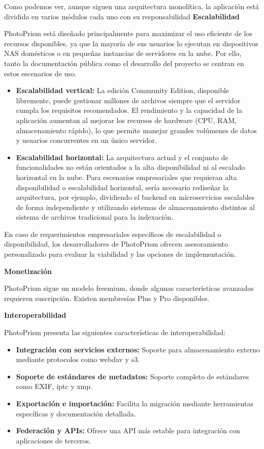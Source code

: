 Como podemos ver, aunque siguen una arquitectura monolítica, la aplicación está dividida en varios módulos cada uno con su responsabilidad
\textbf{Escalabilidad}

PhotoPrism está diseñado principalmente para maximizar el uso eficiente de los recursos disponibles, ya que la mayoría de sus usuarios lo ejecutan en dispositivos NAS domésticos o en pequeñas instancias de servidores en la nube. Por ello, tanto la documentación pública como el desarrollo del proyecto se centran en estos escenarios de uso.

\begin{itemize}
    \item \textbf{Escalabilidad vertical:} La edición Community Edition, disponible libremente, puede gestionar millones de archivos siempre que el servidor cumpla los requisitos recomendados. El rendimiento y la capacidad de la aplicación aumentan al mejorar los recursos de hardware (CPU, RAM, almacenamiento rápido), lo que permite manejar grandes volúmenes de datos y usuarios concurrentes en un único servidor.
    \item \textbf{Escalabilidad horizontal:} La arquitectura actual y el conjunto de funcionalidades no están orientados a la alta disponibilidad ni al escalado horizontal en la nube. Para escenarios empresariales que requieran alta disponibilidad o escalabilidad horizontal, sería necesario rediseñar la arquitectura, por ejemplo, dividiendo el backend en microservicios escalables de forma independiente y utilizando sistemas de almacenamiento distintos al sistema de archivos tradicional para la indexación.
\end{itemize}

En caso de requerimientos empresariales específicos de escalabilidad o disponibilidad, los desarrolladores de PhotoPrism ofrecen asesoramiento personalizado para evaluar la viabilidad y las opciones de implementación.

\textbf{Monetización}

PhotoPrism sigue un modelo freemium, donde algunas características avanzadas requieren suscripción. Existen membresías Plus y Pro disponibles.

\textbf{Interoperabilidad}

PhotoPrism presenta las siguientes características de interoperabilidad:

\begin{itemize}
    \item \textbf{Integración con servicios externos:} Soporte para almacenamiento externo mediante protocolos como \gls{webdav} y \gls{s3}.
    \item \textbf{Soporte de estándares de metadatos:} Soporte completo de estándares como EXIF, \acrshort{iptc} y \acrshort{xmp}.
    \item \textbf{Exportación e importación:} Facilita la migración mediante herramientas específicas y documentación detallada.
    \item \textbf{Federación y APIs:} Ofrece una API más estable para integración con aplicaciones de terceros.
\end{itemize}

